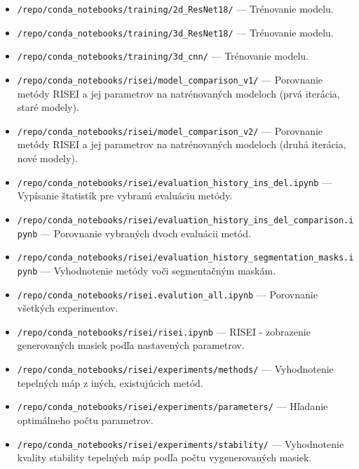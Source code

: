 \begin{itemize}
    \item \texttt{/repo/conda\_notebooks/training/2d\_ResNet18/} --- Trénovanie modelu.
    \item \texttt{/repo/conda\_notebooks/training/3d\_ResNet18/} --- Trénovanie modelu.
    \item \texttt{/repo/conda\_notebooks/training/3d\_cnn/} --- Trénovanie modelu.
    \item \texttt{/repo/conda\_notebooks/risei/model\_comparison\_v1/} --- Porovnanie metódy RISEI a jej parametrov na natrénovaných modeloch (prvá iterácia, staré modely).
    \item \texttt{/repo/conda\_notebooks/risei/model\_comparison\_v2/} --- Porovnanie metódy RISEI a jej parametrov na natrénovaných modeloch (druhá iterácia, nové modely).
    \item \texttt{/repo/conda\_notebooks/risei/evaluation\_history\_ins\_del.ipynb} --- Vypísanie štatistík pre vybranú evaluáciu metódy.
    \item \texttt{/repo/conda\_notebooks/risei/evaluation\_history\_ins\_del\_comparison.ipynb} --- Porovnanie vybraných dvoch evaluácii metód.
    \item \texttt{/repo/conda\_notebooks/risei/evaluation\_history\_segmentation\_masks.ipynb} --- Vyhodnotenie metódy voči segmentačným maskám.
    \item \texttt{/repo/conda\_notebooks/risei.evalution\_all.ipynb} --- Porovnanie všetkých experimentov.
    \item \texttt{/repo/conda\_notebooks/risei/risei.ipynb} --- RISEI - zobrazenie generovaných masiek podľa nastavených parametrov.
    \item \texttt{/repo/conda\_notebooks/risei/experiments/methods/} --- Vyhodnotenie tepelných máp z iných, existujúcich metód.
    \item \texttt{/repo/conda\_notebooks/risei/experiments/parameters/} --- Hľadanie optimálneho počtu parametrov.
    \item \texttt{/repo/conda\_notebooks/risei/experiments/stability/} --- Vyhodnotenie kvality stability tepelných máp podľa počtu vygenerovaných masiek.
\end{itemize}
